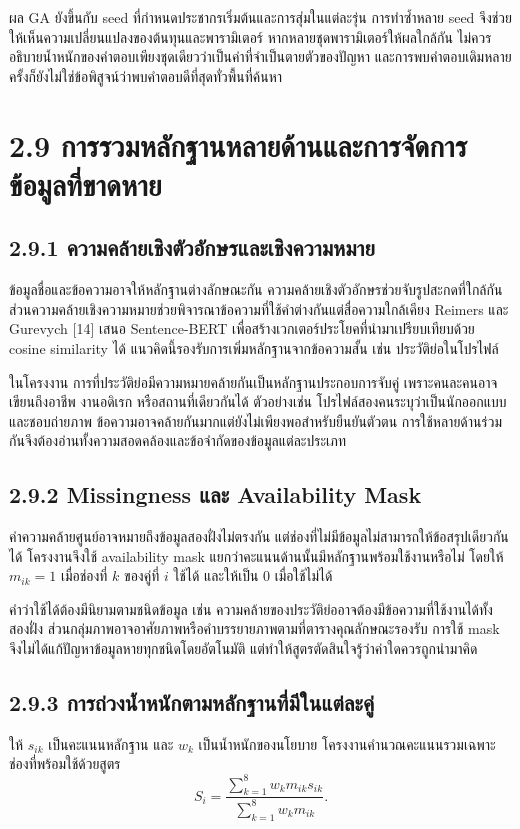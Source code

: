 ผล GA ยังขึ้นกับ seed ที่กำหนดประชากรเริ่มต้นและการสุ่มในแต่ละรุ่น การทำซ้ำหลาย seed จึงช่วยให้เห็นความเปลี่ยนแปลงของต้นทุนและพารามิเตอร์ หากหลายชุดพารามิเตอร์ให้ผลใกล้กัน ไม่ควรอธิบายน้ำหนักของคำตอบเพียงชุดเดียวว่าเป็นค่าที่จำเป็นตายตัวของปัญหา และการพบคำตอบเดิมหลายครั้งก็ยังไม่ใช่ข้อพิสูจน์ว่าพบคำตอบดีที่สุดทั่วพื้นที่ค้นหา

\section*{2.9 การรวมหลักฐานหลายด้านและการจัดการข้อมูลที่ขาดหาย}
\subsection*{2.9.1 ความคล้ายเชิงตัวอักษรและเชิงความหมาย}
ข้อมูลชื่อและข้อความอาจให้หลักฐานต่างลักษณะกัน ความคล้ายเชิงตัวอักษรช่วยจับรูปสะกดที่ใกล้กัน ส่วนความคล้ายเชิงความหมายช่วยพิจารณาข้อความที่ใช้คำต่างกันแต่สื่อความใกล้เคียง Reimers และ Gurevych [14] เสนอ Sentence-BERT เพื่อสร้างเวกเตอร์ประโยคที่นำมาเปรียบเทียบด้วย cosine similarity ได้ แนวคิดนี้รองรับการเพิ่มหลักฐานจากข้อความสั้น เช่น ประวัติย่อในโปรไฟล์

ในโครงงาน การที่ประวัติย่อมีความหมายคล้ายกันเป็นหลักฐานประกอบการจับคู่ เพราะคนละคนอาจเขียนถึงอาชีพ งานอดิเรก หรือสถานที่เดียวกันได้ ตัวอย่างเช่น โปรไฟล์สองคนระบุว่าเป็นนักออกแบบและชอบถ่ายภาพ ข้อความอาจคล้ายกันมากแต่ยังไม่เพียงพอสำหรับยืนยันตัวตน การใช้หลายด้านร่วมกันจึงต้องอ่านทั้งความสอดคล้องและข้อจำกัดของข้อมูลแต่ละประเภท

\subsection*{2.9.2 Missingness และ Availability Mask}
ค่าความคล้ายศูนย์อาจหมายถึงข้อมูลสองฝั่งไม่ตรงกัน แต่ช่องที่ไม่มีข้อมูลไม่สามารถให้ข้อสรุปเดียวกันได้ โครงงานจึงใช้ availability mask แยกว่าคะแนนด้านนั้นมีหลักฐานพร้อมใช้งานหรือไม่ โดยให้ $m_{ik}=1$ เมื่อช่องที่ $k$ ของคู่ที่ $i$ ใช้ได้ และให้เป็น 0 เมื่อใช้ไม่ได้

คำว่าใช้ได้ต้องมีนิยามตามชนิดข้อมูล เช่น ความคล้ายของประวัติย่ออาจต้องมีข้อความที่ใช้งานได้ทั้งสองฝั่ง ส่วนกลุ่มภาพอาจอาศัยภาพหรือคำบรรยายภาพตามที่ตารางคุณลักษณะรองรับ การใช้ mask จึงไม่ได้แก้ปัญหาข้อมูลหายทุกชนิดโดยอัตโนมัติ แต่ทำให้สูตรตัดสินใจรู้ว่าค่าใดควรถูกนำมาคิด

\subsection*{2.9.3 การถ่วงน้ำหนักตามหลักฐานที่มีในแต่ละคู่}
ให้ $s_{ik}$ เป็นคะแนนหลักฐาน และ $w_k$ เป็นน้ำหนักของนโยบาย โครงงานคำนวณคะแนนรวมเฉพาะช่องที่พร้อมใช้ด้วยสูตร
\begin{equation*}
S_i=\frac{\sum_{k=1}^{8}w_km_{ik}s_{ik}}{\sum_{k=1}^{8}w_km_{ik}}.
\end{equation*}

